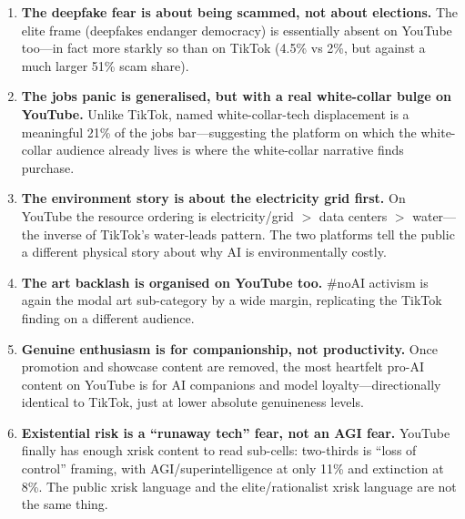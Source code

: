\documentclass[11pt]{article}
\begin{document}
\begin{enumerate}
  \item \textbf{The deepfake fear is about being scammed, not about elections.}
  The elite frame (deepfakes endanger democracy) is essentially absent on
  YouTube too---in fact more starkly so than on TikTok (4.5\% vs 2\%, but
  against a much larger 51\% scam share).
  \item \textbf{The jobs panic is generalised, but with a real white-collar
  bulge on YouTube.} Unlike TikTok, named white-collar-tech displacement is a
  meaningful 21\% of the jobs bar---suggesting the platform on which the
  white-collar audience already lives is where the white-collar narrative finds
  purchase.
  \item \textbf{The environment story is about the electricity grid first.} On
  YouTube the resource ordering is electricity/grid $>$ data centers $>$
  water---the inverse of TikTok's water-leads pattern. The two platforms tell
  the public a different physical story about why AI is environmentally costly.
  \item \textbf{The art backlash is organised on YouTube too.} \#noAI activism
  is again the modal art sub-category by a wide margin, replicating the TikTok
  finding on a different audience.
  \item \textbf{Genuine enthusiasm is for companionship, not productivity.} Once
  promotion and showcase content are removed, the most heartfelt pro-AI content
  on YouTube is for AI companions and model loyalty---directionally identical to
  TikTok, just at lower absolute genuineness levels.
  \item \textbf{Existential risk is a ``runaway tech'' fear, not an AGI fear.}
  YouTube finally has enough xrisk content to read sub-cells: two-thirds is
  ``loss of control'' framing, with AGI/superintelligence at only 11\% and
  extinction at 8\%. The public xrisk language and the elite/rationalist xrisk
  language are not the same thing.
\end{enumerate}
\end{document}
